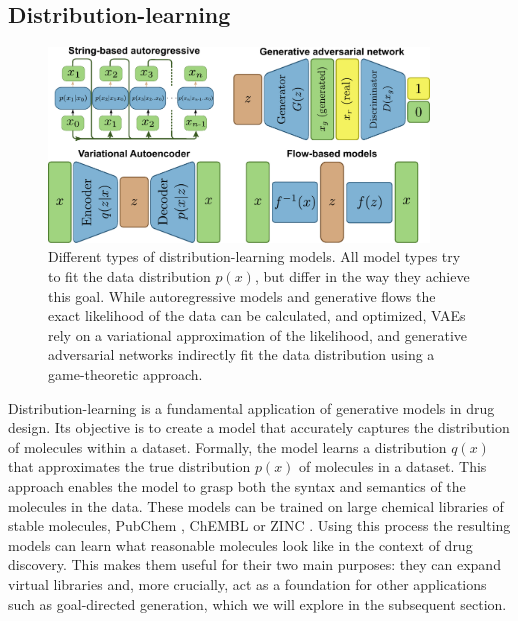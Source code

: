 \subsection{Distribution-learning}
\begin{figure}
      \centering
      \includegraphics[width=0.9\textwidth]{figures/distribution-learning-models.pdf}
      \caption{Different types of distribution-learning models. All model types
            try to fit the data distribution $p(x)$, but differ in the way they achieve this goal.
            While autoregressive models and generative flows the exact likelihood of the data can be calculated,
            and optimized, VAEs rely on a variational approximation of the likelihood, and generative adversarial networks
            indirectly fit the data distribution using a game-theoretic approach. \label{fig:distribution-learning-models}}
\end{figure}
Distribution-learning is a fundamental application of generative models in drug design. Its
objective is to create a model that accurately captures the distribution of molecules within a
dataset. Formally, the model learns a distribution $q(x)$ that approximates the true distribution
$p(x)$ of molecules in a dataset. This approach enables the model to grasp both the syntax and semantics of the
molecules in the data. These models can be trained on large chemical libraries of stable
molecules, PubChem \citep{kimPubChemSubstanceCompound2016}, ChEMBL \citep{bentoChEMBLBioactivityDatabase2014} or
ZINC \citep{irwinZINCFreeTool2012}. Using this process the resulting models can learn what reasonable molecules look like
in the context of drug discovery. This makes them useful for their two main purposes: they can
expand virtual libraries and, more crucially, act as a foundation for other applications such as
goal-directed generation, which we will explore in the subsequent section.

